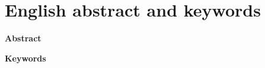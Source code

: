 \label{LastBodyPage}\clearpage\onecolumn
\section*{English abstract and keywords}
{\large\bfseries \LetterEnglishTitle\par}\bigskip
\noindent\textbf{Abstract}\quad 


\noindent\textbf{Keywords}\quad\LetterEnglishKeywords
